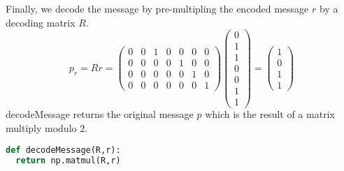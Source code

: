 \documentclass[12pt]{article}
\begin{document}
\noindent Finally, we decode the message by pre-multipling the encoded message $r$ by a decoding matrix $R$.
\[
  p_r = Rr = 
  \begin{pmatrix}
    0 & 0 & 1 & 0 & 0 & 0 & 0 \\
    0 & 0 & 0 & 0 & 1 & 0 & 0 \\
    0 & 0 & 0 & 0 & 0 & 1 & 0 \\
    0 & 0 & 0 & 0 & 0 & 0 & 1 
  \end{pmatrix} 
  \begin{pmatrix}
    0 \\
    1 \\
    1 \\
    0 \\
    0 \\
    1 \\
    1 
  \end{pmatrix} 
  =
  \begin{pmatrix}
    1 \\
    0 \\
    1 \\
    1
  \end{pmatrix} 
\]
decodeMessage returns the original message $p$ which is the result of a matrix multiply modulo 2.
\begin{lstlisting}[frame=single,language=Python,caption=decodeMessage \label{code:makeMessage}]
def decodeMessage(R,r): 
  return np.matmul(R,r)
\end{lstlisting}
\end{document}
